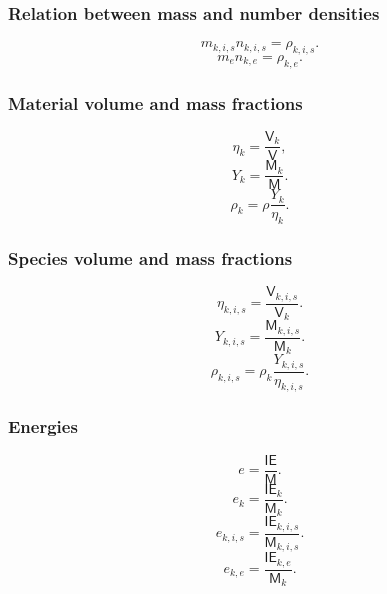\documentclass[a4paper,11pt]{report}
\begin{document}
\subsubsection{Relation between mass and number densities}

\begin{equation}
    \label{eq:mm_mass_number_densities_i}
    m_{k,i,s} n_{k,i,s} = \rho_{k,i,s}.
\end{equation}
\begin{equation}
    \label{eq:mm_mass_number_densities_e}
    m_e n_{k,e} = \rho_{k,e}.
\end{equation}

\subsubsection{Material volume and mass fractions}

\begin{equation}
    \eta_k = \frac{\mathsf{V}_k}{\mathsf{V}},
\end{equation}
\begin{equation}
    Y_k = \frac{\mathsf{M}_k}{\mathsf{M}}.
\end{equation}
\begin{equation}
    \rho_k = \rho \frac{Y_k}{\eta_k}.
\end{equation}
 
\subsubsection{Species volume and mass fractions}

\begin{equation}
    \eta_{k,i,s} = \frac{\mathsf{V}_{k,i,s}}{\mathsf{V}_k}.
\end{equation}
\begin{equation}
    Y_{k,i,s} = \frac{\mathsf{M}_{k,i,s}}{\mathsf{M}_k}.
\end{equation}
\begin{equation}
    \label{eq:mm_tri_relation_kis}
    \rho_{k,i,s} = \rho_k \frac{Y_{k,i,s}}{\eta_{k,i,s}}.
\end{equation}

\subsubsection{Energies}

\begin{equation}
    e = \frac{\mathsf{IE}}{\mathsf{M}}.
\end{equation}
\begin{equation}
    e_k = \frac{\mathsf{IE}_k}{\mathsf{M}_k}.
\end{equation}
\begin{equation}
    e_{k,i,s} = \frac{\mathsf{IE}_{k,i,s}}{\mathsf{M}_{k,i,s}}.
\end{equation}
\begin{equation}
    e_{k,e} = \frac{\mathsf{IE}_{k,e}}{\mathsf{M}_k}.
\end{equation}
\end{document}
